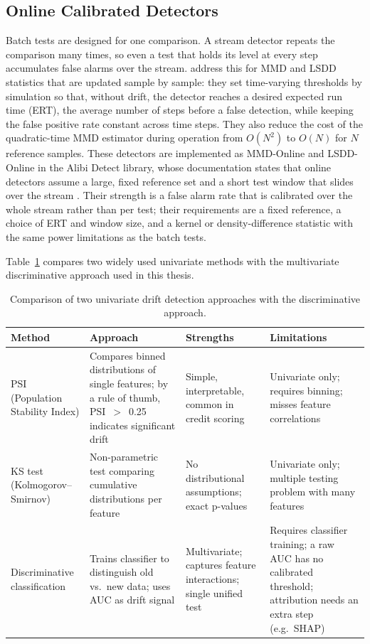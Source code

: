 \subsection{Online Calibrated Detectors}
Batch tests are designed for one comparison. A stream detector repeats the comparison many times, so even a test that holds its level at every step accumulates false alarms over the stream. \citet{CobbSequential2022} address this for MMD and LSDD statistics that are updated sample by sample: they set time-varying thresholds by simulation so that, without drift, the detector reaches a desired expected run time (ERT), the average number of steps before a false detection, while keeping the false positive rate constant across time steps. They also reduce the cost of the quadratic-time MMD estimator during operation from $O(N^2)$ to $O(N)$ for $N$ reference samples. These detectors are implemented as MMD-Online and LSDD-Online in the Alibi Detect library, whose documentation states that online detectors assume a large, fixed reference set and a short test window that slides over the stream \citep{AlibiDetect}. Their strength is a false alarm rate that is calibrated over the whole stream rather than per test; their requirements are a fixed reference, a choice of ERT and window size, and a kernel or density-difference statistic with the same power limitations as the batch tests.

Table~\ref{tab:method-comparison} compares two widely used univariate methods with the multivariate discriminative approach used in this thesis.

\begin{table}[!htbp]
\centering
\caption[Comparison of drift detection approaches]{Comparison of two univariate drift detection approaches with the discriminative approach.}
\label{tab:method-comparison}
\small
\begin{tabular}{>{\raggedright\arraybackslash}p{2.4cm}>{\raggedright\arraybackslash}p{3.7cm}>{\raggedright\arraybackslash}p{3.0cm}>{\raggedright\arraybackslash}p{3.6cm}}
\toprule
Method & Approach & Strengths & Limitations \\
\midrule
PSI (Population Stability Index) & Compares binned distributions of single features; by a rule of thumb, PSI~$>$~0.25 indicates significant drift \citep{Yurdakul2018} & Simple, interpretable, common in credit scoring \citep{Yurdakul2018} & Univariate only; requires binning; misses feature correlations \\
\addlinespace
KS test (Kolmogorov--Smirnov) & Non-parametric test comparing cumulative distributions per feature & No distributional assumptions; exact p-values & Univariate only; multiple testing problem with many features \\
\addlinespace
Discriminative classification & Trains classifier to distinguish old vs.\ new data; uses AUC as drift signal & Multivariate; captures feature interactions; single unified test & Requires classifier training; a raw AUC has no calibrated threshold; attribution needs an extra step (e.g.\ SHAP)\\
\bottomrule
\end{tabular}
\end{table}

